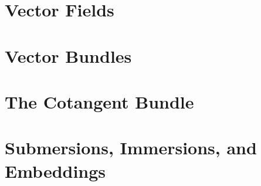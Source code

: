 \section{Vector Fields}
\label{section-vector-fields}

\section{Vector Bundles}
\label{section-vector-bundles}

\section{The Cotangent Bundle}
\label{section-cotangent-bundle}

\section{Submersions, Immersions, and Embeddings}
\label{section-submersions-immersions-embeddings}







